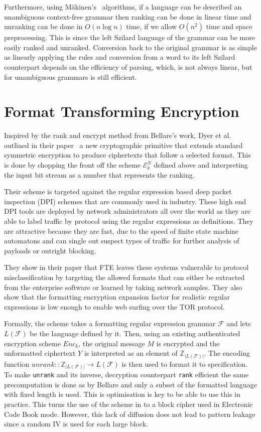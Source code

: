 \documentclass[ %
                    author={Samuel Russell},
                supervisor={Prof. Bogdan Warinschi},
                    degree={MEng},
                     title={Innocuous Ciphertexts},
                  subtitle={The DE-CENSOR Scheme},
                      type={Research},
                      year={2018} ]{dissertation}
\begin{document}
Furthermore, using M\"akinen's~\cite{rankcf} algorithms, if a language can be described an unambiguous context-free grammar then ranking can be done in linear time and unranking can be done in $O(n \log n)$ time, if we allow $O(n^2)$ time and space preprocessing. This is since the left Szilard language of the grammar can be more easily ranked and unranked. Conversion back to the original grammar is as simple as linearly applying the rules and conversion from a word to its left Szilard counterpart depends on the efficiency of parsing, which, is not always linear, but for unambiguous grammars is still efficient.

\section{Format Transforming Encryption}\label{sec:FTE}

Inspired by the rank and encrypt method from Bellare's work, Dyer et al. outlined in their paper~\cite{fte} a new cryptographic primitive that extends standard symmetric encryption to produce ciphertexts that follow a selected format. This is done by chopping the front off the scheme $\mathcal{E}^N_k$ defined above and interpreting the input bit stream as a number that represents the ranking.

Their scheme is targeted against the regular expression based deep packet inspection (DPI) schemes that are commonly used in industry. These high end DPI tools are deployed by network administrators all over the world as they are able to label traffic by protocol using the regular expressions as definitions. They are attractive because they are fast, due to the speed of finite state machine automatons and can single out suspect types of traffic for further analysis of payloads or outright blocking.

They show in their paper that FTE leaves these systems vulnerable to protocol misclassification by targeting the allowed formats that can either be extracted from the enterprise software or learned by taking network samples. They also show that the formatting encryption expansion factor for realistic regular expressions is low enough to enable web surfing over the TOR protocol.

Formally, the scheme takes a formatting regular expression grammar $\mathcal{F}$ and lets $L(\mathcal{F})$ be the language defined by it. Then, using an existing authenticated encryption scheme $Enc_k$, the original message $M$ is encrypted and the unformatted ciphertext $Y$ is interpreted as an element of $\mathbb{Z}_{\vert L(\mathcal{F}) \vert}$. The encoding function $unrank :: \mathbb{Z}_{\vert L(\mathcal{F}) \vert} \rightarrow L(\mathcal{F})$ is then used to format it to specification. To make \texttt{unrank} and its inverse, decryption counterpart \texttt{rank} efficient the same precomputation is done as by Bellare and only a subset of the formatted language with fixed length is used. This is optimisation is key to be able to use this in practice. This turns the use of the scheme in to a block cipher used in Electronic Code Book mode. However, this lack of diffusion does not lead to pattern leakage since a random IV is used for each large block.
\end{document}
